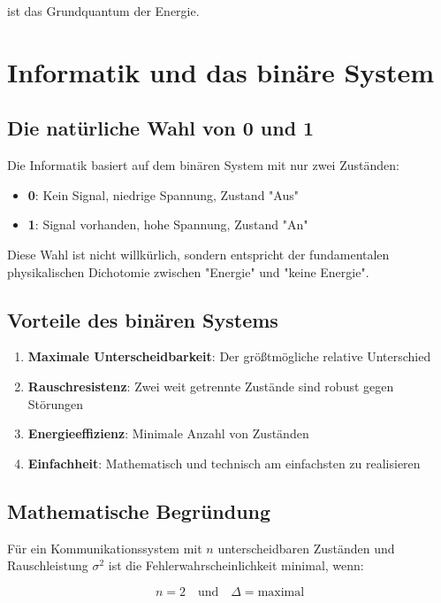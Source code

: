 ﻿\documentclass[12pt,a4paper]{article}
\theoremstyle{definition}
\theoremstyle{remark}
\begin{document}
ist das Grundquantum der Energie.

\section{Informatik und das binäre System}

\subsection{Die natürliche Wahl von 0 und 1}

Die Informatik basiert auf dem binären System mit nur zwei Zuständen:
\begin{itemize}
\item \textbf{0}: Kein Signal, niedrige Spannung, Zustand "Aus"
\item \textbf{1}: Signal vorhanden, hohe Spannung, Zustand "An"
\end{itemize}

Diese Wahl ist nicht willkürlich, sondern entspricht der fundamentalen physikalischen Dichotomie zwischen "Energie" und "keine Energie".

\subsection{Vorteile des binären Systems}

\begin{enumerate}
\item \textbf{Maximale Unterscheidbarkeit}: Der größtmögliche relative Unterschied
\item \textbf{Rauschresistenz}: Zwei weit getrennte Zustände sind robust gegen Störungen
\item \textbf{Energieeffizienz}: Minimale Anzahl von Zuständen
\item \textbf{Einfachheit}: Mathematisch und technisch am einfachsten zu realisieren
\end{enumerate}

\subsection{Mathematische Begründung}

Für ein Kommunikationssystem mit $n$ unterscheidbaren Zuständen und Rauschleistung $\sigma^2$ ist die Fehlerwahrscheinlichkeit minimal, wenn:

\begin{equation}
n = 2 \quad \text{und} \quad \Delta = \text{maximal}
\end{equation}
\end{document}
